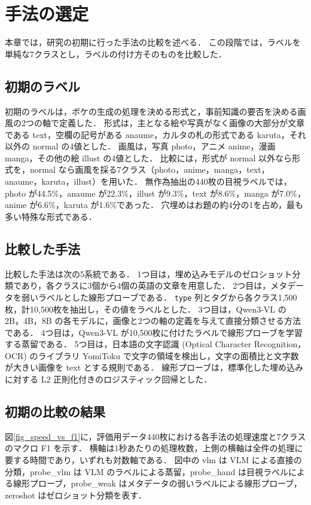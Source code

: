 \section{手法の選定}
\label{sec_selection}
本章では，研究の初期に行った手法の比較を述べる．
この段階では，ラベルを単純な7クラスとし，ラベルの付け方そのものを比較した．

\subsection{初期のラベル}
初期のラベルは，ボケの生成の処理を決める形式と，事前知識の要否を決める画風の2つの軸で定義した．
形式は，主となる絵や写真がなく画像の大部分が文章である text，空欄の記号がある anaume，カルタの札の形式である karuta，それ以外の normal の4値とした．
画風は，写真 photo，アニメ anime，漫画 manga，その他の絵 illust の4値とした．
比較には，形式が normal 以外なら形式を，normal なら画風を採る7クラス（photo，anime，manga，text，anaume，karuta，illust）を用いた．
無作為抽出の440枚の目視ラベルでは，photo が44.5\%，anaume が22.3\%，illust が9.3\%，text が8.6\%，manga が7.0\%，anime が6.6\%，karuta が1.6\%であった．
穴埋めはお題の約4分の1を占め，最も多い特殊な形式である．

\subsection{比較した手法}
比較した手法は次の5系統である．
1つ目は，埋め込みモデルのゼロショット分類であり，各クラスに3個から4個の英語の文章を用意した．
2つ目は，メタデータを弱いラベルとした線形プローブである．
\texttt{type} 列とタグから各クラス1,500枚，計10,500枚を抽出し，その値をラベルとした．
3つ目は，Qwen3-VL の 2B，4B，8B の各モデルに，画像と2つの軸の定義を与えて直接分類させる方法である．
4つ目は，Qwen3-VL が10,500枚に付けたラベルで線形プローブを学習する蒸留である．
5つ目は，日本語の文字認識 (Optical Character Recognition，OCR) のライブラリ YomiToku\cite{ref_yomitoku} で文字の領域を検出し，文字の面積比と文字数が大きい画像を text とする規則である．
線形プローブは，標準化した埋め込みに対する L2 正則化付きのロジスティック回帰とした．

\subsection{初期の比較の結果}
図\ref{fig_speed_vs_f1}に，評価用データ440枚における各手法の処理速度と7クラスのマクロ F1 を示す．
横軸は1秒あたりの処理枚数，上側の横軸は全件の処理に要する時間であり，いずれも対数軸である．
図中の vlm は VLM による直接の分類，probe\_vlm は VLM のラベルによる蒸留，probe\_hand は目視ラベルによる線形プローブ，probe\_weak はメタデータの弱いラベルによる線形プローブ，zeroshot はゼロショット分類を表す．

